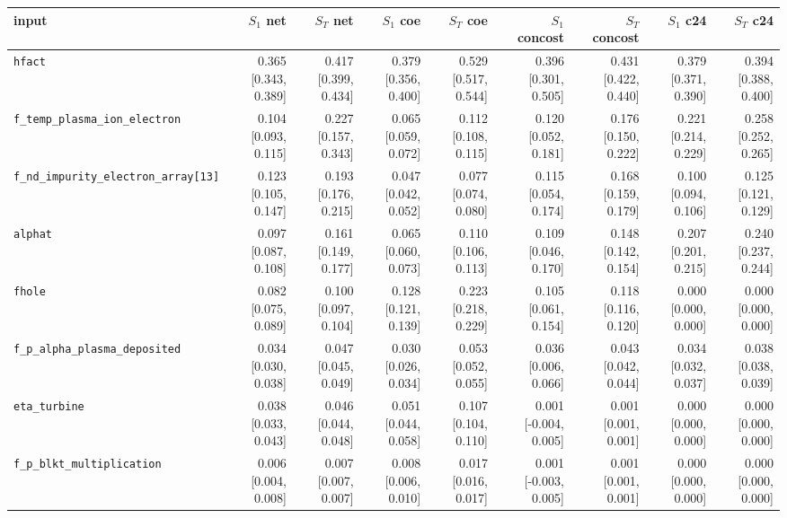\begin{tabular}{lrrrrrrrr}
\toprule
input & $S_1$ net & $S_T$ net & $S_1$ coe & $S_T$ coe & $S_1$ concost & $S_T$ concost & $S_1$ c24 & $S_T$ c24 \\
\midrule
\texttt{hfact} & 0.365 [0.343, 0.389] & 0.417 [0.399, 0.434] & 0.379 [0.356, 0.400] & 0.529 [0.517, 0.544] & 0.396 [0.301, 0.505] & 0.431 [0.422, 0.440] & 0.379 [0.371, 0.390] & 0.394 [0.388, 0.400] \\
\texttt{f\_temp\_plasma\_ion\_electron} & 0.104 [0.093, 0.115] & 0.227 [0.157, 0.343] & 0.065 [0.059, 0.072] & 0.112 [0.108, 0.115] & 0.120 [0.052, 0.181] & 0.176 [0.150, 0.222] & 0.221 [0.214, 0.229] & 0.258 [0.252, 0.265] \\
\texttt{f\_nd\_impurity\_electron\_array[13]} & 0.123 [0.105, 0.147] & 0.193 [0.176, 0.215] & 0.047 [0.042, 0.052] & 0.077 [0.074, 0.080] & 0.115 [0.054, 0.174] & 0.168 [0.159, 0.179] & 0.100 [0.094, 0.106] & 0.125 [0.121, 0.129] \\
\texttt{alphat} & 0.097 [0.087, 0.108] & 0.161 [0.149, 0.177] & 0.065 [0.060, 0.073] & 0.110 [0.106, 0.113] & 0.109 [0.046, 0.170] & 0.148 [0.142, 0.154] & 0.207 [0.201, 0.215] & 0.240 [0.237, 0.244] \\
\texttt{fhole} & 0.082 [0.075, 0.089] & 0.100 [0.097, 0.104] & 0.128 [0.121, 0.139] & 0.223 [0.218, 0.229] & 0.105 [0.061, 0.154] & 0.118 [0.116, 0.120] & 0.000 [0.000, 0.000] & 0.000 [0.000, 0.000] \\
\texttt{f\_p\_alpha\_plasma\_deposited} & 0.034 [0.030, 0.038] & 0.047 [0.045, 0.049] & 0.030 [0.026, 0.034] & 0.053 [0.052, 0.055] & 0.036 [0.006, 0.066] & 0.043 [0.042, 0.044] & 0.034 [0.032, 0.037] & 0.038 [0.038, 0.039] \\
\texttt{eta\_turbine} & 0.038 [0.033, 0.043] & 0.046 [0.044, 0.048] & 0.051 [0.044, 0.058] & 0.107 [0.104, 0.110] & 0.001 [-0.004, 0.005] & 0.001 [0.001, 0.001] & 0.000 [0.000, 0.000] & 0.000 [0.000, 0.000] \\
\texttt{f\_p\_blkt\_multiplication} & 0.006 [0.004, 0.008] & 0.007 [0.007, 0.007] & 0.008 [0.006, 0.010] & 0.017 [0.016, 0.017] & 0.001 [-0.003, 0.005] & 0.001 [0.001, 0.001] & 0.000 [0.000, 0.000] & 0.000 [0.000, 0.000] \\

\end{tabular}
